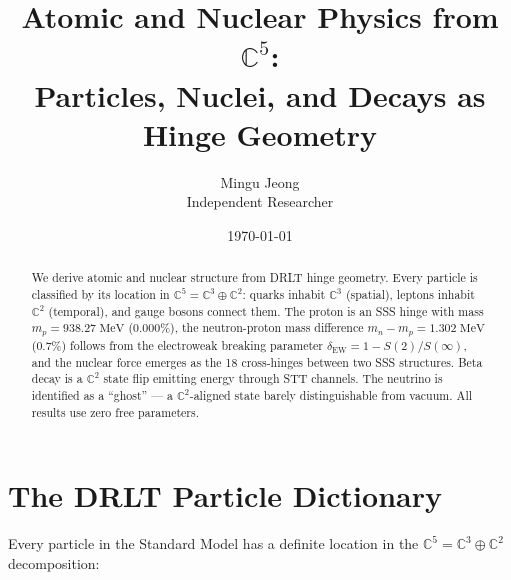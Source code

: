 \documentclass[12pt]{article}
\theoremstyle{remark}
\begin{document}
\title{Atomic and Nuclear Physics from $\mathbb{C}^5$:\\Particles, Nuclei, and Decays as Hinge Geometry}
\author{Mingu Jeong\\Independent Researcher}
\date{\today}
\maketitle

\begin{abstract}
We derive atomic and nuclear structure from DRLT hinge geometry. Every particle is classified by its location in $\mathbb{C}^5 = \mathbb{C}^3 \oplus \mathbb{C}^2$: quarks inhabit $\mathbb{C}^3$ (spatial), leptons inhabit $\mathbb{C}^2$ (temporal), and gauge bosons connect them. The proton is an SSS hinge with mass $m_p = 938.27\;\text{MeV}$ (0.000\%), the neutron-proton mass difference $m_n - m_p = 1.302\;\text{MeV}$ (0.7\%) follows from the electroweak breaking parameter $\delta_\text{EW} = 1 - S(2)/S(\infty)$, and the nuclear force emerges as the 18 cross-hinges between two SSS structures. Beta decay is a $\mathbb{C}^2$ state flip emitting energy through STT channels. The neutrino is identified as a ``ghost'' --- a $\mathbb{C}^2$-aligned state barely distinguishable from vacuum. All results use zero free parameters.
\end{abstract}

\tableofcontents

\section{The DRLT Particle Dictionary}

Every particle in the Standard Model has a definite location in the $\mathbb{C}^5 = \mathbb{C}^3 \oplus \mathbb{C}^2$ decomposition:
\end{document}
